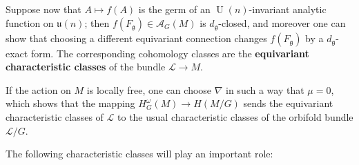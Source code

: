 \documentclass{article}
\newcommand{\ra}{\rightarrow}
\newcommand{\w}{\omega}
\newcommand{\mcA}{\mathcal{A}}
\newcommand{\mcL}{\mathcal{L}}
\newcommand{\mfg}{\mathfrak{g}}
\newcommand{\mf}[1]{\mathfrak{#1}}
\DeclareMathOperator{\UU}{U}
\begin{document}
	Suppose now that $A \mapsto f(A)$ is the germ of an $\UU(n)$-invariant analytic function on $\mf{u}(n)$; then $f(F_{\mfg}) \in \mcA_{G}(M)$ is $d_{\mfg}$-closed, and moreover one can show that choosing a different equivariant connection changes $f(F_{\mfg})$ by a $d_{\mfg}$-exact form. The corresponding cohomology classes are the \textbf{equivariant characteristic classes} of the bundle $\mcL \ra M$.
	
	If the action on $M$ is locally free, one can choose $\nabla$ in such a way that $\mu = 0$, which shows that the mapping $H_{G}^{\w}(M) \ra H(M/G)$ sends the equivariant characteristic classes of $\mcL$ to the usual characteristic classes of the orbifold bundle $\mcL/G$.
	
	The following characteristic classes will play an important role:
	
\end{document}
